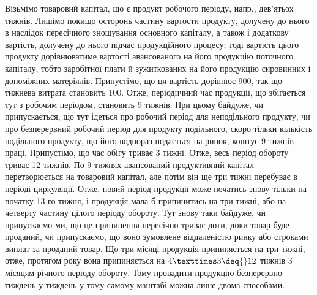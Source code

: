 Візьмімо товаровий капітал, що є продукт робочого періоду, напр.,
де\-в’я\-тьох тижнів. Лишімо покищо осторонь частину вартости продукту,
долучену до нього в наслідок пересічного зношування основного капіталу,
а також і додаткову вартість, долучену до нього підчас продукційного
процесу; тоді вартість цього продукту дорівнюватиме вартості
авансованого на його продукцію поточного капіталу, тобто заробітної плати
й зужиткованих на його продукцію сировинних і допоміжних матеріялів.
Припустімо, що ця вартість дорівнює 900, так що тижнева
витрата становить 100. Отже, періодичний час продукції, що
збігається тут з робочим періодом, становить 9 тижнів. При цьому байдуже,
чи припускається, що тут ідеться про робочий період для неподільного
продукту, чи про безперервний робочий період для продукту
подільного, скоро тільки кількість подільного продукту, що його воднораз
подається на ринок, коштує 9 тижнів праці. Припустімо, що час
обігу триває 3 тижні. Отже, весь період обороту триває 12 тижнів.
По 9 тижнях авансований продуктивний капітал перетворюється на товаровий
капітал, але потім він ще три тижні перебуває в періоді циркуляції.
Отже, новий період продукції може початись знову тільки на початку
13-го тижня, і продукція мала б припинитись на три тижні, або на
четверту частину цілого періоду обороту. Тут знову таки байдуже, чи
припускаємо ми, що це припинення пересічно триває доти, доки товар
буде проданий, чи припускаємо, що воно зумовлене віддаленістю ринку
або строками виплат за проданий товар. Що три місяці продукція
припиняється на три тижні, отже, протягом року вона припиняється на
$4×3 \deq{} 12$ тижнів \deq{} 3 місяцям \deq{}  річного періоду обороту. Тому
провадити продукцію безперервно тиждень у тиждень у тому самому
маштабі можна лише двома способами.

